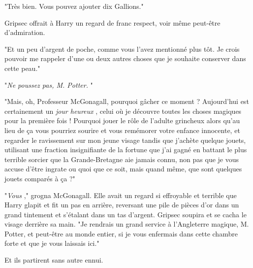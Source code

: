 "Très bien. Vous pouvez ajouter dix Gallions."

Gripsec offrait à Harry un regard de franc respect, voir même peut-être d'admiration.

"Et un peu d'argent de poche, comme vous l'avez mentionné plus tôt. Je crois pouvoir me rappeler d'une ou deux autres choses que je souhaite conserver dans cette peau."

"\emph{Ne poussez pas, M. Potter.} "

"Mais, oh, Professeur McGonagall, pourquoi gâcher ce moment ? Aujourd'hui est certainement un \emph{jour heureux} , celui où je découvre toutes les choses magiques pour la première fois ! Pourquoi jouer le rôle de l'adulte grincheux alors qu'au lieu de ça vous pourriez sourire et vous remémorer votre enfance innocente, et regarder le ravissement sur mon jeune visage tandis que j'achète quelque jouets, utilisant une fraction insignifiante de la fortune que j'ai gagné en battant le plus terrible sorcier que la Grande-Bretagne aie jamais connu, non pas que je vous accuse d'être ingrate ou quoi que ce soit, mais quand même, que sont quelques jouets comparés à ça ?"

"\emph{Vous} ," grogna McGonagall. Elle avait un regard si effroyable et terrible que Harry glapit et fit un pas en arrière, reversant une pile de pièces d'or dans un grand tintement et s'étalant dans un tas d'argent. Gripsec soupira et se cacha le visage derrière sa main. "Je rendrais un grand service à l'Angleterre magique, M. Potter, et peut-être au monde entier, si je vous enfermais dans cette chambre forte et que je vous laissais ici."

Et ils partirent sans autre ennui.

